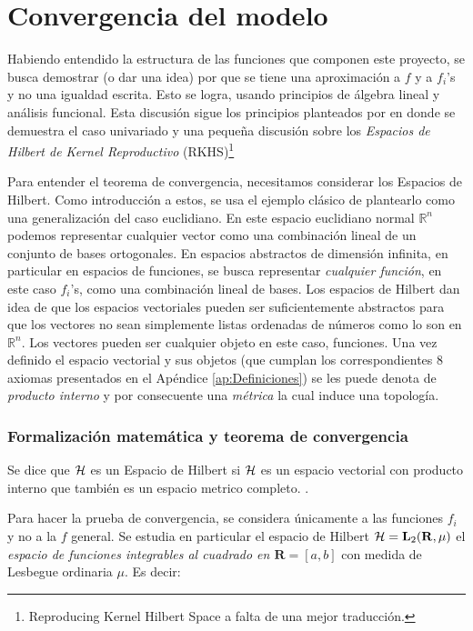 \documentclass[../Main/Main.tex]{subfiles}
\begin{document}
\section{Convergencia del modelo} \label{sec:Convergencia}

Habiendo entendido la estructura de las funciones que componen este proyecto, se busca demostrar (o dar una idea) por que se tiene una aproximación a $f$ y a $f_i$'s y no una igualdad escrita. Esto se logra, usando principios de álgebra lineal y análisis funcional. Esta discusión sigue los principios planteados por \autocite{bergstrom1985estimation} en donde se demuestra el caso univariado y una pequeña discusión sobre los  \textit{Espacios de Hilbert de Kernel Reproductivo} (RKHS)\footnote{Reproducing Kernel Hilbert Space a falta de una mejor traducción.} 

Para entender el teorema de convergencia, necesitamos considerar los Espacios de Hilbert. Como introducción a estos, se usa el ejemplo clásico de plantearlo como una generalización del caso euclidiano. En este espacio euclidiano normal $\mathbb{R}^n$ podemos representar cualquier vector como una combinación lineal de un conjunto de bases ortogonales.  En espacios abstractos de dimensión infinita, en particular en espacios de funciones, se busca representar \textit{cualquier función}, en este caso $f_i$'s, como una combinación lineal de bases. Los espacios de Hilbert dan idea de que los espacios vectoriales pueden ser suficientemente abstractos para que los vectores no sean simplemente listas ordenadas de números como lo son en $\mathbb{R}^n$. Los vectores pueden ser cualquier objeto en este caso, funciones. Una vez definido el espacio vectorial y sus objetos (que cumplan los correspondientes 8 axiomas presentados en el Apéndice \ref{ap:Definiciones}) se les puede denota de \textit{producto interno} y por consecuente una \textit{métrica} la cual induce una topología.

\subsubsection{Formalización matemática y teorema de convergencia}

Se dice que $\mathcal{H}$ es un Espacio de Hilbert si $\mathcal{H}$ es un espacio vectorial con producto interno que también es un espacio metrico completo. \autocite{rudin1987real}.

Para hacer la prueba de convergencia, se considera únicamente a las funciones $f_i$ y no a la $f$ general. Se estudia en particular el espacio de Hilbert $\mathcal{H} = \mathbf{L}_2(\mathbf{R},\mu)$ el \textit{espacio de funciones integrables al cuadrado en $\mathbf{R} = [a,b]$} con medida de Lesbegue ordinaria $\mu$. Es decir: 
\end{document}

